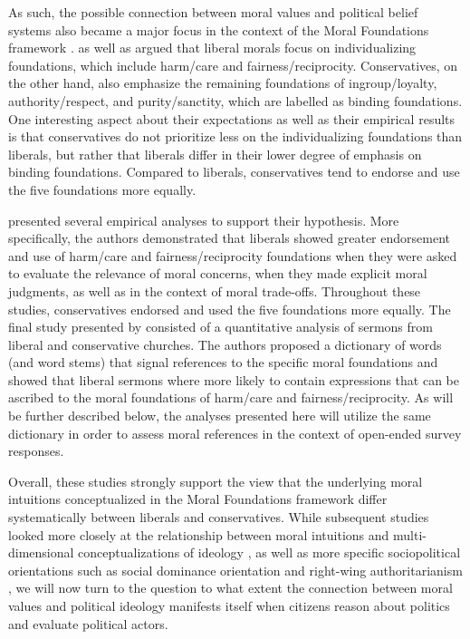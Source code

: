 \documentclass[12pt]{paper}
\begin{document}
As such, the possible connection between moral values and political belief systems also became a major focus in the context of the Moral Foundations framework \citep[c.f.][]{haidt2012righteous}. \citet{haidt2007morality} as well as \citet{graham2009liberals} argued that liberal morals focus on individualizing foundations, which include harm/care and fairness/reciprocity. Conservatives, on the other hand, also emphasize the remaining foundations of ingroup/loyalty, authority/respect, and purity/sanctity, which are labelled as binding foundations. One interesting aspect about their expectations as well as their empirical results is that conservatives do not prioritize less on the individualizing foundations than liberals, but rather that liberals differ in their lower degree of emphasis on binding foundations. Compared to liberals, conservatives tend to endorse and use the five foundations more equally.

\citet{graham2009liberals} presented several empirical analyses to support their hypothesis. More specifically, the authors demonstrated that liberals showed greater endorsement and use of harm/care and fairness/reciprocity foundations when they were asked to evaluate the relevance of moral concerns, when they made explicit moral judgments, as well as in the context of moral trade-offs. Throughout these studies, conservatives endorsed and used the five foundations more equally. The final study presented by \citet{graham2009liberals} consisted of a quantitative analysis of sermons from liberal and conservative churches. The authors proposed a dictionary of words (and word stems) that signal references to the specific moral foundations and showed that liberal sermons where more likely to contain expressions that can be ascribed to the moral foundations of harm/care and fairness/reciprocity. As will be further described below, the analyses presented here will utilize the same dictionary in order to assess moral references in the context of open-ended survey responses.

Overall, these studies strongly support the view that the underlying moral intuitions conceptualized in the Moral Foundations framework differ systematically between liberals and conservatives. While subsequent studies looked more closely at the relationship between moral intuitions and multi-dimensional conceptualizations of ideology \citep[c.f.][]{haidt2009above}, as well as more specific sociopolitical orientations such as social dominance orientation and right-wing authoritarianism \citep[c.f.][]{federico2013mapping}, we will now turn to the question to what extent the connection between moral values and political ideology manifests itself when citizens reason about politics and evaluate political actors.
\end{document}
